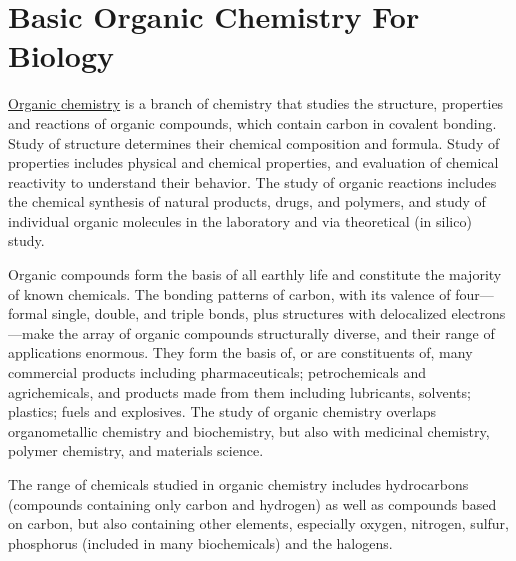 \hypertarget{basic-organic-chemistry-for-biology}{%
\chapter{Basic Organic Chemistry For Biology}\label{basic-organic-chemistry-for-biology}}

\href{https://en.wikipedia.org/wiki/Organic_chemistry}{Organic chemistry} is a branch of chemistry that studies the structure, properties and reactions of organic compounds, which contain carbon in covalent bonding. Study of structure determines their chemical composition and formula. Study of properties includes physical and chemical properties, and evaluation of chemical reactivity to understand their behavior. The study of organic reactions includes the chemical synthesis of natural products, drugs, and polymers, and study of individual organic molecules in the laboratory and via theoretical (in silico) study.

Organic compounds form the basis of all earthly life and constitute the majority of known chemicals. The bonding patterns of carbon, with its valence of four---formal single, double, and triple bonds, plus structures with delocalized electrons---make the array of organic compounds structurally diverse, and their range of applications enormous. They form the basis of, or are constituents of, many commercial products including pharmaceuticals; petrochemicals and agrichemicals, and products made from them including lubricants, solvents; plastics; fuels and explosives. The study of organic chemistry overlaps organometallic chemistry and biochemistry, but also with medicinal chemistry, polymer chemistry, and materials science.

The range of chemicals studied in organic chemistry includes hydrocarbons (compounds containing only carbon and hydrogen) as well as compounds based on carbon, but also containing other elements, especially oxygen, nitrogen, sulfur, phosphorus (included in many biochemicals) and the halogens.

